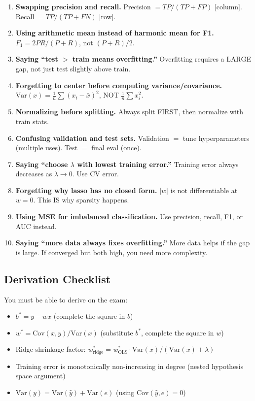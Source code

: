 \documentclass[11pt,a4paper]{article}
\begin{document}
\begin{enumerate}
    \item \textbf{Swapping precision and recall.} Precision $= TP/(TP+FP)$ [column]. Recall $= TP/(TP+FN)$ [row].
    \item \textbf{Using arithmetic mean instead of harmonic mean for F1.} $F_1 = 2PR/(P+R)$, not $(P+R)/2$.
    \item \textbf{Saying ``test $>$ train means overfitting.''} Overfitting requires a LARGE gap, not just test slightly above train.
    \item \textbf{Forgetting to center before computing variance/covariance.} $\text{Var}(x) = \frac{1}{n}\sum(x_i - \bar{x})^2$, NOT $\frac{1}{n}\sum x_i^2$.
    \item \textbf{Normalizing before splitting.} Always split FIRST, then normalize with train stats.
    \item \textbf{Confusing validation and test sets.} Validation $=$ tune hyperparameters (multiple uses). Test $=$ final eval (once).
    \item \textbf{Saying ``choose $\lambda$ with lowest training error.''} Training error always decreases as $\lambda \to 0$. Use CV error.
    \item \textbf{Forgetting why lasso has no closed form.} $|w|$ is not differentiable at $w=0$. This IS why sparsity happens.
    \item \textbf{Using MSE for imbalanced classification.} Use precision, recall, F1, or AUC instead.
    \item \textbf{Saying ``more data always fixes overfitting.''} More data helps if the gap is large. If converged but both high, you need more complexity.
\end{enumerate}

\subsection{Derivation Checklist}

You must be able to derive on the exam:
\begin{itemize}
    \item $b^* = \bar{y} - w\bar{x}$ (complete the square in $b$)
    \item $w^* = \text{Cov}(x,y)/\text{Var}(x)$ (substitute $b^*$, complete the square in $w$)
    \item Ridge shrinkage factor: $w^*_{\text{ridge}} = w^*_{\text{OLS}} \cdot \text{Var}(x)/(\text{Var}(x) + \lambda)$
    \item Training error is monotonically non-increasing in degree (nested hypothesis space argument)
    \item $\text{Var}(y) = \text{Var}(\hat{y}) + \text{Var}(e)$ (using $\text{Cov}(\hat{y}, e) = 0$)
\end{itemize}
\end{document}
